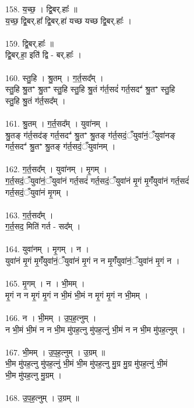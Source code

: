 158. य॒च्छ॒ । द्वि॒बर्.हाः᳚ ॥\\
य॒च्छ॒ द्वि॒बर्.हा᳚ द्वि॒बर्.हा॑ यच्छ यच्छ द्वि॒बर्.हाः᳚ ।\\
\\
159. द्वि॒बर्.हाः᳚ ॥\\
द्वि॒बर्.हा॒ इति॑ द्वि - बर्.हाः᳚ ।\\
\\
160. स्तु॒हि । श्रु॒तम् । ग॒र्त॒सद᳚म् ।\\
स्तु॒हि श्रु॒तꣲ श्रु॒तꣲ स्तु॒हि स्तु॒हि श्रु॒तं ग॑र्त॒सदं॑ गर्त॒सदꣲ॑ श्रु॒तꣲ स्तु॒हि\\
स्तु॒हि श्रु॒तं ग॑र्त॒सद᳚म् ।\\
\\
161. श्रु॒तम् । ग॒र्त॒सद᳚म् । युवा॑नम् ।\\
श्रु॒तङ् ग॑र्त॒सद॑ङ् गर्त॒सदꣲ॑ श्रु॒तꣲ श्रु॒तङ् ग॑र्त॒सदं॒ँयुवा॑नं॒ँयुवा॑नङ्\\
गर्त॒सदꣲ॑ श्रु॒तꣲ श्रु॒तङ् ग॑र्त॒सदं॒ँयुवा॑नम् ।\\
\\
162. ग॒र्त॒सद᳚म् । युवा॑नम् । मृ॒गम् ।\\
ग॒र्त॒सदं॒ँयुवा॑नं॒ँयुवा॑नं गर्त॒सदं॑ गर्त॒सदं॒ँयुवा॑नं मृ॒गं मृ॒गंँयुवा॑नं गर्त॒सदं॑\\
गर्त॒सदं॒ँयुवा॑नं मृ॒गम् ।\\
\\
163. ग॒र्त॒सद᳚म् ।\\
ग॒र्त॒सद॒ मिति॑ गर्त - सद᳚म् ।\\
\\
164. युवा॑नम् । मृ॒गम् । न ।\\
युवा॑नं मृ॒गं मृ॒गंँयुवा॑नं॒ँयुवा॑नं मृ॒गं न न मृ॒गंँयुवा॑नं॒ँयुवा॑नं मृ॒गं न ।\\
\\
165. मृ॒गम् । न । भी॒मम् ।\\
मृ॒गं न न मृ॒गं मृ॒गं न भी॒मं भी॒मं न मृ॒गं मृ॒गं न भी॒मम् ।\\
\\
166. न । भी॒मम् । उ॒प॒ह॒त्नुम् ।\\
न भी॒मं भी॒मं न न भी॒म मु॑पह॒त्नु मु॑पह॒त्नुं भी॒मं न न भी॒म मु॑पह॒त्नुम् ।\\
\\
167. भी॒मम् । उ॒प॒ह॒त्नुम् । उ॒ग्रम् ॥\\
भी॒म मु॑पह॒त्नु मु॑पह॒त्नुं भी॒मं भी॒म मु॑पह॒त्नु मु॒ग्र मु॒ग्र मु॑पह॒त्नुं भी॒मं\\
भी॒म मु॑पह॒त्नु मु॒ग्रम् ।\\
\\
168. उ॒प॒ह॒त्नुम् । उ॒ग्रम् ॥\\
